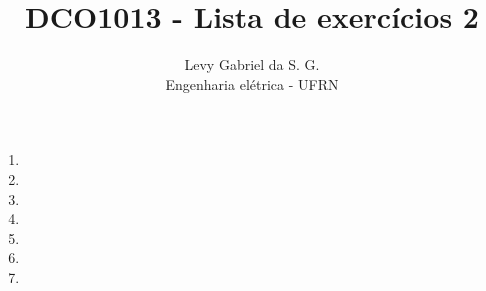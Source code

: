 \title{DCO1013 - Lista de exercícios 2}
\author{Levy Gabriel da S. G. \\ Engenharia elétrica - UFRN}

\maketitle
\thispagestyle{fancy}

\begin{enumerate}
    \item 
    \item 
    \item 
    \item 
    \item 
    \item 
    \item 
\end{enumerate}